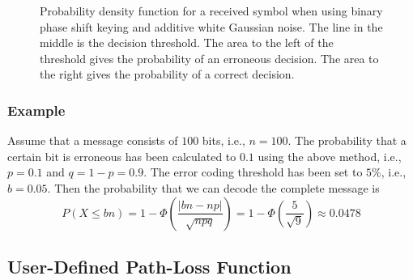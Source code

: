 \documentclass[final,twoside]{rapport}
\begin{document}
\begin{figure}
  \centerline{
%
  }
  \caption{Probability density function for a received symbol when using
    binary phase shift keying and additive white Gaussian noise. The
    line in the middle is the decision threshold. The area to the left
    of the threshold gives the probability of an erroneous decision.
    The area to the right gives the probability of a correct decision.}
  \label{fig:error}
\end{figure}

\subsubsection*{Example}

Assume that a message consists of $100$ bits, i.e., $n=100$. The
probability that a certain bit is erroneous has been calculated to
$0.1$ using the above method, i.e., $p=0.1$ and $q=1-p=0.9$. The error
coding threshold has been set to $5$\%, i.e., $b=0.05$. Then the
probability that we can decode the complete message is
\[
P(X\le
bn)=1-\Phi(\frac{\left|bn-np\right|}{\sqrt{npq}})=1-\Phi(\frac{5}{\sqrt{9}})\approx
0.0478
\]

\subsection{User-Defined Path-Loss Function}
\end{document}
